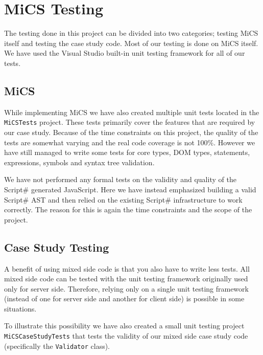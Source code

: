 \chapter{MiCS Testing}
	The testing done in this project can be divided into two categories; testing MiCS itself and testing the case study code. Most of our testing is done on MiCS itself. We have used the Visual Studio built-in unit testing framework for all of our tests.
\section{MiCS} %
\label{sec:mics}
	While implementing MiCS we have also created multiple unit tests located in the \texttt{MiCSTests} project. These tests primarily cover the features that are required by our case study. Because of the time constraints on this project, the quality of the tests are somewhat varying and the real code coverage is not 100\%. However we have still managed to write some tests for core types, DOM types, statements, expressions, symbols and syntax tree validation.

	We have not performed any formal tests on the validity and quality of the Script\# generated JavaScript. Here we have instead emphasized building a valid Script\# AST and then relied on the existing Script\# infrastructure to work correctly. The reason for this is again the time constraints and the scope of the project.
\section{Case Study Testing} %
\label{sec:user_code_testing}
	A benefit of using mixed side code is that you also have to write less tests. All mixed side code can be tested with the unit testing framework originally used only for server side. Therefore, relying only on a single unit testing framework (instead of one for server side and another for client side) is possible in some situations.

	To illustrate this possibility we have also created a small unit testing project \texttt{MiCSCaseStudyTests} that tests the validity of our mixed side case study code (specifically the \texttt{Validator} class).

